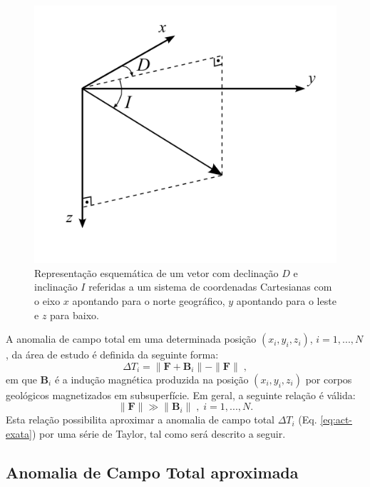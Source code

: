 \documentclass[10pt,a4paper,fleqn]{article}
\begin{document}
\begin{figure}[h]
    \centering
    \includegraphics[scale=1]{Figs/Fig1.png}
    \caption{Representação esquemática de um vetor com declinação $D$ e inclinação $I$ referidas
        a um sistema de coordenadas Cartesianas com o eixo $x$ apontando para o norte geográfico,
        $y$ apontando para o leste e $z$ para baixo.}   
    \label{fig:fig1}
\end{figure}

A anomalia de campo total em uma determinada posição $(x_{i}, y_{i}, z_{i})$, $i = 1,...,N$,
da \'{a}rea de estudo é definida da seguinte forma:
\begin{equation}
\Delta T_{i} = \| \mathbf{F} + \mathbf{B}_{i} \| - \| \mathbf{F} \| \; ,
\label{eq:act-exata}
\end{equation}
em que $\mathbf{B}_{i}$ é a indução magn\'{e}tica produzida na posição $(x_{i}, y_{i}, z_{i})$
por corpos geol\'{o}gicos magnetizados em subsuperf\'{i}cie. Em geral, a seguinte relaç\~{a}o
\'{e} v\'{a}lida:
\begin{equation}
\| \mathbf{F} \| \gg \| \mathbf{B}_{i} \| \; , \; i = 1,...,N.
\label{eq:f-maior-maior-b}
\end{equation}
Esta relaç\~{a}o possibilita aproximar a anomalia de campo total $\Delta T_{i}$ 
(Eq. \ref{eq:act-exata}) por uma s\'{e}rie de Taylor, tal como será descrito a seguir.

\subsection{Anomalia de Campo Total aproximada}
\end{document}
